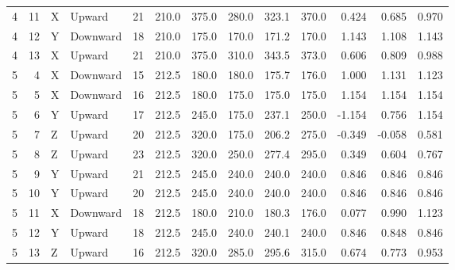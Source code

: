 \begin{longtable}{rrllrrrrrrrrr}
4 & 11 & X & Upward & 21 & 210.0 & 375.0 & 280.0 & 323.1 & 370.0 & 0.424 & 0.685 & 0.970 \\
4 & 12 & Y & Downward & 18 & 210.0 & 175.0 & 170.0 & 171.2 & 170.0 & 1.143 & 1.108 & 1.143 \\
4 & 13 & X & Upward & 21 & 210.0 & 375.0 & 310.0 & 343.5 & 373.0 & 0.606 & 0.809 & 0.988 \\
5 & 4 & X & Downward & 15 & 212.5 & 180.0 & 180.0 & 175.7 & 176.0 & 1.000 & 1.131 & 1.123 \\
5 & 5 & X & Downward & 16 & 212.5 & 180.0 & 175.0 & 175.0 & 175.0 & 1.154 & 1.154 & 1.154 \\
5 & 6 & Y & Upward & 17 & 212.5 & 245.0 & 175.0 & 237.1 & 250.0 & -1.154 & 0.756 & 1.154 \\
5 & 7 & Z & Upward & 20 & 212.5 & 320.0 & 175.0 & 206.2 & 275.0 & -0.349 & -0.058 & 0.581 \\
5 & 8 & Z & Upward & 23 & 212.5 & 320.0 & 250.0 & 277.4 & 295.0 & 0.349 & 0.604 & 0.767 \\
5 & 9 & Y & Upward & 21 & 212.5 & 245.0 & 240.0 & 240.0 & 240.0 & 0.846 & 0.846 & 0.846 \\
5 & 10 & Y & Upward & 20 & 212.5 & 245.0 & 240.0 & 240.0 & 240.0 & 0.846 & 0.846 & 0.846 \\
5 & 11 & X & Downward & 18 & 212.5 & 180.0 & 210.0 & 180.3 & 176.0 & 0.077 & 0.990 & 1.123 \\
5 & 12 & Y & Upward & 18 & 212.5 & 245.0 & 240.0 & 240.1 & 240.0 & 0.846 & 0.848 & 0.846 \\
5 & 13 & Z & Upward & 16 & 212.5 & 320.0 & 285.0 & 295.6 & 315.0 & 0.674 & 0.773 & 0.953 \\
\end{longtable}
